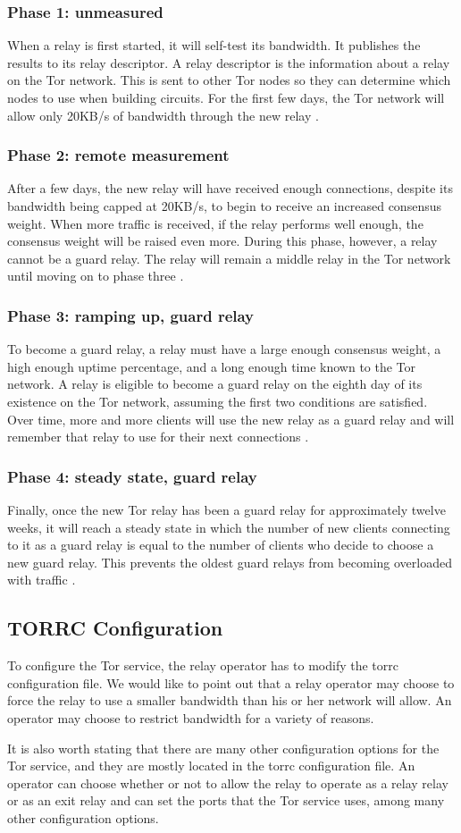 \documentclass[12pt,journal]{IEEEtran}
\begin{document}
\subsubsection{Phase 1: unmeasured}
When a relay is first started, it will self-test its bandwidth. It publishes the results to its relay descriptor. A relay descriptor is the information about a relay on the Tor network. This is sent to other Tor nodes so they can determine which nodes to use when building circuits. For the first few days, the Tor network will allow only 20KB/s of bandwidth through the new relay \cite{arma2013}.
\subsubsection{Phase 2: remote measurement}
After a few days, the new relay will have received enough connections, despite its bandwidth being capped at 20KB/s, to begin to receive an increased consensus weight. When more traffic is received, if the relay performs well enough, the consensus weight will be raised even more. During this phase, however, a relay cannot be a guard relay. The relay will remain a middle relay in the Tor network until moving on to phase three \cite{arma2013}.
\subsubsection{Phase 3: ramping up, guard relay}
To become a guard relay, a relay must have a large enough consensus weight, a high enough uptime percentage, and a long enough time known to the Tor network. A relay is eligible to become a guard relay on the eighth day of its existence on the Tor network, assuming the first two conditions are satisfied. Over time, more and more clients will use the new relay as a guard relay and will remember that relay to use for their next connections \cite{arma2013}.
\subsubsection{Phase 4: steady state, guard relay}
Finally, once the new Tor relay has been a guard relay for approximately twelve weeks, it will reach a steady state in which the number of new clients connecting to it as a guard relay is equal to the number of clients who decide to choose a new guard relay. This prevents the oldest guard relays from becoming overloaded with traffic \cite{arma2013}.
\subsection{TORRC Configuration}
To configure the Tor service, the relay operator has to modify the torrc configuration file. We would like to point out that a relay operator may choose to force the relay to use a smaller bandwidth than his or her network will allow. An operator may choose to restrict bandwidth for a variety of reasons.
\par
It is also worth stating that there are many other configuration options for the Tor service, and they are mostly located in the torrc configuration file. An operator can choose whether or not to allow the relay to operate as a relay relay or as an exit relay and can set the ports that the Tor service uses, among many other configuration options.
\end{document}
